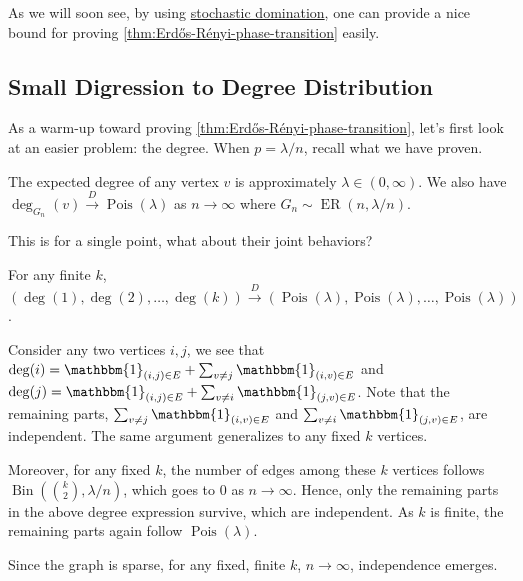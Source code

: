 As we will soon see, by using \hyperref[def:stochastic-domination]{stochastic domination}, one can provide a nice bound for proving \autoref{thm:Erdős-Rényi-phase-transition} easily.

\subsection{Small Digression to Degree Distribution}
As a warm-up toward proving \autoref{thm:Erdős-Rényi-phase-transition}, let's first look at an easier problem: the degree. When \(p = \lambda / n\), recall what we have proven.

\begin{prev}
	The expected degree of any vertex \(v\) is approximately \(\lambda \in (0, \infty )\). We also have \(\deg_{G_n}(v) \overset{D}{\to} \operatorname{Pois}(\lambda ) \) as \(n \to \infty \) where \(G_n \sim \operatorname{ER}(n, \lambda / n) \).
\end{prev}

This is for a single point, what about their joint behaviors?

\begin{claim}
	For any finite \(k\), \((\deg(1), \deg(2), \dots , \deg(k)) \overset{D}{\to} (\operatorname{Pois}(\lambda ) , \operatorname{Pois}(\lambda ), \dots , \operatorname{Pois}(\lambda ) )\).
\end{claim}
\begin{explanation}
	Consider any two vertices \(i, j\), we see that \(\deg(i) = \mathbbm{1}_{(i, j) \in E} + \sum_{v \neq j} \mathbbm{1}_{(i, v) \in E} \) and \(\deg(j) = \mathbbm{1}_{(i, j) \in E} + \sum_{v \neq i} \mathbbm{1}_{(j, v) \in E}\). Note that the remaining parts, \(\sum_{v \neq j} \mathbbm{1}_{(i, v) \in E} \) and \(\sum_{v \neq i} \mathbbm{1}_{(j, v) \in E} \), are independent. The same argument generalizes to any fixed \(k\) vertices.

	Moreover, for any fixed \(k\), the number of edges among these \(k\) vertices follows \(\operatorname{Bin}(\binom{k}{2}, \lambda / n) \), which goes to \(0\) as \(n \to \infty \). Hence, only the remaining parts in the above degree expression survive, which are independent. As \(k\) is finite, the remaining parts again follow \(\operatorname{Pois}(\lambda ) \).
\end{explanation}

\begin{intuition}
	Since the graph is sparse, for any fixed, finite \(k\),  \(n \to \infty \), independence emerges.
\end{intuition}

